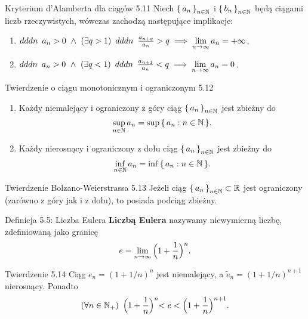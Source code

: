 \documentclass{article}
\newcommand{\hquad}{\mkern9mu}
\newcommand{\R}{\mathbb{R}}
\newcommand{\N}{\mathbb{N}}
\newcommand{\lin}[1]{\lim\limits_{n\to\infty}{#1}}
\newcommand{\seq}[1]{\set{#1_n}_{n\in\N}}
\begin{document}
\begin{twier}{Kryterium d'Alamberta dla ciągów 5.11}
Niech $\seq{a}$ i $\seq{b}$ będą ciągami liczb rzeczywistych, wówczas zachodzą następujące implikacje:
\begin{enumerate}[label=\Roman*.]
    \item $dddn\hquad a_n>0\ \land\ (\exists q>1)\hquad dddn\hquad \frac{a_{n+q}}{a_n}>q\implies \lin{a_n}=+\infty$,
    \item $dddn\hquad a_n>0\ \land\ (\exists q<1)\hquad dddn\hquad \frac{a_{n+1}}{a_n}<q\implies \lin{a_n}=0$.
\end{enumerate}
\end{twier}

\smallskip

\begin{twier}{Twierdzenie o ciągu monotonicznym i ograniczonym 5.12}
\begin{enumerate}[label=\Roman*.]
    \item Każdy niemalejący i ograniczony z góry ciąg $\seq{a}$ jest zbieżny do
    \[\sup\limits_{n\in\N}{a_n}=\sup{\set{a_n:n\in\N}}.\]
    \item Każdy nierosnący i ograniczony z dołu ciąg $\seq{a}$ jest zbieżny do
    \[\inf\limits_{n\in\N}{a_n}=\inf{\set{a_n:n\in\N}}.\]
\end{enumerate}
\end{twier}

\begin{twier}{Twierdzenie Bolzano-Weierstrassa 5.13}
Jeżeli ciąg $\seq{a}\subset \R$ jest ograniczony (zarówno z góry jak i z dołu), to posiada podciąg zbieżny.
\end{twier}

\begin{defr}{Definicja 5.5: Liczba Eulera}
    \textbf{Liczbą Eulera} nazywamy niewymierną liczbę, zdefiniowaną jako granicę 
    \begin{equation*}
        e=\lin{\Bigl(1+\frac{1}{n}\Bigl)^n}.
    \end{equation*}
\end{defr}

\begin{twier}{Twierdzenie 5.14}
Ciąg $e_n=(1+ 1/n)^n$ jest niemalejący, a $\tilde{e}_n=(1+1/n)^{n+1}$ nierosnący. Ponadto
\begin{equation*}
    (\forall n\in\N_+)\hquad \Bigl(1+\frac{1}{n}\Bigl)^n < e < \Bigl(1+\frac{1}{n}\Bigl)^{n+1}.
\end{equation*}
\end{twier}
\end{document}
